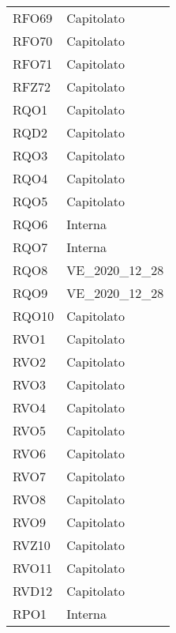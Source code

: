 \begin{longtable}{C{6cm} C{3cm}}
    RFO69 & Capitolato \\
    
    RFO70 & Capitolato \\
    
    RFO71 & Capitolato \\
    
    RFZ72 & Capitolato \\
    
	RQO1 & Capitolato \\
	
	RQD2 & Capitolato \\
	
	RQO3 & Capitolato \\
	
	RQO4 & Capitolato \\

	RQO5 & Capitolato \\

	RQO6 & Interna \\

	RQO7 & Interna  \\
	
	RQO8 & VE\_2020\_12\_28 \\
	
	RQO9 & VE\_2020\_12\_28 \\
	
	RQO10 & Capitolato \\
	
	RVO1 & Capitolato \\
	
	RVO2 & Capitolato \\
	
	RVO3 & Capitolato \\
	
	RVO4 & Capitolato \\
	
	RVO5 & Capitolato \\
	
	RVO6 & Capitolato \\
	
	RVO7 & Capitolato \\
	
	RVO8 & Capitolato \\
	
	RVO9 & Capitolato \\
	
	RVZ10 & Capitolato \\
	
	RVO11 & Capitolato \\
	
	RVD12 & Capitolato \\
	
    RPO1 & Interna \\
    
\end{longtable}
